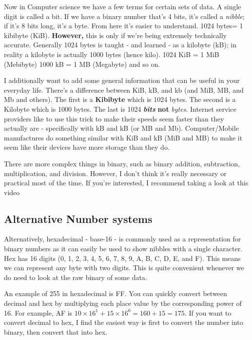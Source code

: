 \documentclass[12pt,a4paper]{book}
\begin{document}
			Now in Computer science we have a few terms for certain sets of data. A single digit is called a bit. If we have a binary number that's 4 bits, it's called a \textit{nibble}; if it's 8 bits long, it's a byte. From here it's easier to understand. 1024 bytes= 1 kibibyte (KiB). \textbf{However,} this is only if we're being extremely technically accurate. Generally 1024 bytes is taught - and learned - as a kilobyte (kB); in reality a kilobyte is actually 1000 bytes (hence kilo). 1024 KiB = 1 MiB (Mebibyte) 1000 kB = 1 MB (Megabyte) and so on.
				
			I additionally want to add some general information that can be useful in your everyday life. There's a difference between KiB, kB, and kb (and MiB, MB, and Mb and others). The first is a \textbf{Kibibyte} which is 1024 bytes. The second is a Kilobyte which is 1000 bytes. The last is 1024 \textit{\textbf{bits}} \textbf{not} \textit{bytes}. Internet service providers like to use this trick to make their speeds seem faster than they actually are - specifically with kB and kB (or MB and Mb). Computer/Mobile manufactures do something similar with KiB and kB (MiB and MB) to make it seem like their devices have more storage than they do. 
				
				There are more complex things in binary, such as binary addition, subtraction, multiplication, and division. However, I don't think it's really necessary or practical most of the time. If you're interested, I recommend taking a look at this video 
			
			\subsection{Alternative Number systems}
			Alternatively, hexadecimal - base-16 - is commonly used as a representation for binary numbers as it can easily be used to show nibbles with a single character. Hex has 16 digits (0, 1, 2, 3, 4, 5, 6, 7, 8, 9, A, B, C, D, E, and F). This means we can represent any byte with two digits. This is quite convenient whenever we do need to look at the raw binary of some data.
				
			An example of 255 in hexadecimal is FF. You can quickly convert between decimal and hex by multiplying each place value by the corresponding power of 16. For example, AF is $10\times16^{1}+15\times16^{0}=160+15=175$. If you want to convert decimal to hex, I find the easiest way is first to convert the number into binary, then convert that into hex.
				
\end{document}
